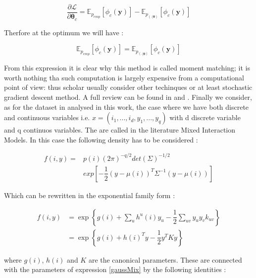 \documentclass[12pt,%
               a4paper,%
               oneside,openany,%
               titlepage,%
               headinclude,footinclude,%
               BCOR5mm,%
               cleardoublepage=empty,%
               tablecaptionabove,%
               floatperchapter,
               ]{scrreprt}                 %
\begin{document}
\begin{equation}
\frac{\partial\mathcal{L}}{\partial\boldsymbol{\theta}_{c}}=\mathbb{E}_{p_{emp}}\left[\phi_{c}(\textbf{y})\right]-\mathbb{E}_{p_{(\cdot|\boldsymbol{\theta})}}\left[\phi_{c}(\textbf{y})\right]
\end{equation}

Therfore at the optimum we will have \cite{murphy2012machine}:

\begin{equation}
\mathbb{E}_{p_{emp}}\left[\phi_{c}(\textbf{y})\right]=\mathbb{E}_{p_{(\cdot|\boldsymbol{\theta})}}\left[\phi_{c}(\textbf{y})\right]
\end{equation}

From this expression it is clear why this method is called moment matching; it is worth nothing tha such computation is largely expensive from a computational point of view: thus scholar usually consider other techinques or at least stochastic gradient descent method. A full review can be found in \cite{murphy2012machine} and \cite{koller2009probabilistic}. Finally we consider, as for the dataset in analysed in this work, the case where we have both discrete and continuous variables i.e. $x=\left(i_{1},...,i_{d},y_{1},...,y_{q} \right)$ with d discrete variable and q continuos variables. The are called in the literature Mixed Interaction Models. In this case the following density has to be considered \cite{hojsgaard2012graphical}:

\begin{equation}
\begin{split}
f(i,y)=& p(i)(2\pi)^{-q/2}det(\Sigma)^{-1/2} \\
& exp\left[-\dfrac{1}{2}\left(y-\mu(i)\right)^{T}\Sigma^{-1}\left(y-\mu(i)\right)\right]
\end{split}
\label{gaussMix}
\end{equation}

Which can be rewritten in the exponential family form \cite{hojsgaard2012graphical}: 

\begin{equation}
\begin{split}
f(i,y) & = \exp\left\lbrace g(i)+\sum_{u}h^{u}(i)y_{u}-\dfrac{1}{2}\sum_{uv} y_{u}y_{v}k_{uv}\right\rbrace \\
&= \exp\left\lbrace g(i)+h(i)^{T}y-\dfrac{1}{2}y^{T}Ky \right\rbrace
\end{split}
\end{equation}

where $g(i)$, $h(i)$ and $K$ are the canonical parameters. These are connected with the parameters of expression \ref{gaussMix} by the following identities \cite{hojsgaard2012graphical}: 
\end{document}
